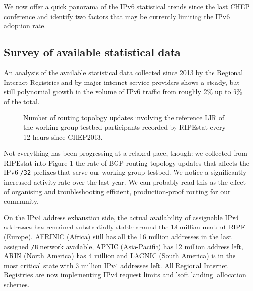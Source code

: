 We now offer a quick panorama of the IPv6 statistical trends since the last
CHEP conference and identify two factors that may be currently limiting 
the IPv6 adoption rate. 
\subsection{Survey of available statistical data}
An analysis of the available statistical data collected since 2013
by the Regional Internet Registries \cite{ripeipv6,arinstat,apnicstat,afrinicipv6,lacnicipc6} and by major internet
service providers \cite{akamaistats,googlestats} shows a steady, but
still polynomial growth in the volume of IPv6 traffic from roughly 
2\% up to 6\% of the total. 
\begin{figure}
\centering
\def\svgwidth{\columnwidth}

\caption{Number of routing topology updates involving the reference LIR of the working group testbed participants recorded by RIPEstat \cite{ripestat} every 12 hours since CHEP2013.}
\label{fig:bgpupdates}
\end{figure}
Not everything has been progressing at a relaxed pace, though: we collected from RIPEstat \cite{ripestat} into Figure \ref{fig:bgpupdates} the
rate of BGP routing topology updates that affects
the IPv6 {\tt/32} prefixes that serve our
working group testbed. We notice a significantly increased activity rate over the
last year. We can probably read this as the effect of organising and troubleshooting efficient, production-proof routing for our community.\par
On the IPv4 address exhaustion side, the actual availability of
assignable IPv4 addresses has remained substantially stable around the 18 million mark at RIPE (Europe). AFRINIC (Africa) still has all the 16 million addresses in the last assigned {\tt /8} network available, APNIC (Asia-Pacific) has 12 million address left, ARIN (North America) has 4 million and LACNIC (South America) is in
the most critical state with 3 million IPv4 addresses left.
All Regional Internet Registries are
now implementing IPv4 request limits and 'soft landing' allocation schemes.
